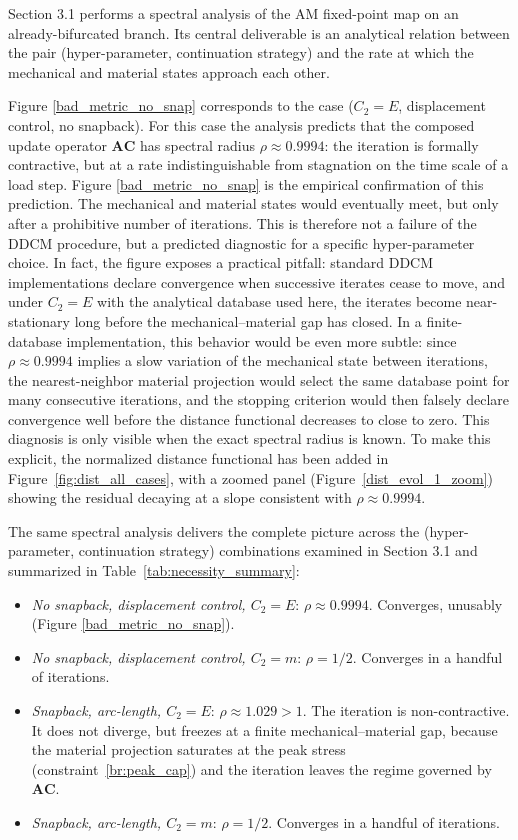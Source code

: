 \documentclass[10pt]{article}
\begin{document}
\begin{enumerate}
Section 3.1 performs a spectral analysis of the AM fixed-point map on an already-bifurcated branch. Its central deliverable is an analytical relation between the pair (hyper-parameter, continuation strategy) and the rate at which the mechanical and material states approach each other.

Figure \ref{bad_metric_no_snap} corresponds to the case ($C_2 = E$, displacement control, no snapback). For this case the analysis predicts that the composed update operator $\mathbf{A}\mathbf{C}$ has spectral radius $\rho \approx 0.9994$: the iteration is formally contractive, but at a rate indistinguishable from stagnation on the time scale of a load step. Figure \ref{bad_metric_no_snap} is the empirical confirmation of this prediction. The mechanical and material states would eventually meet, but only after a prohibitive number of iterations. This is therefore not a failure of the DDCM procedure, but a predicted diagnostic for a specific hyper-parameter choice. In fact, the figure exposes a practical pitfall: standard DDCM implementations declare convergence when successive iterates cease to move, and under $C_2 = E$ with the analytical database used here, the iterates become near-stationary long before the mechanical--material gap has closed. In a finite-database implementation, this behavior would be even more subtle: since $\rho \approx 0.9994$ implies a slow variation of the mechanical state between iterations, the nearest-neighbor material projection would select the same database point for many consecutive iterations, and the stopping criterion would then falsely declare convergence well before the distance functional decreases to close to zero. This diagnosis is only visible when the exact spectral radius is known. To make this explicit, the normalized distance functional has been added in Figure~\ref{fig:dist_all_cases}, with a zoomed panel (Figure~\ref{dist_evol_1_zoom}) showing the residual decaying at a slope consistent with $\rho \approx 0.9994$.


The same spectral analysis delivers the complete picture across the (hyper-parameter, continuation strategy) combinations examined in
Section 3.1 and summarized in Table~\ref{tab:necessity_summary}:
\begin{itemize}
	\item \emph{No snapback, displacement control, $C_2 = E$}: 	$\rho \approx 0.9994$. Converges, unusably (Figure \ref{bad_metric_no_snap}).
	\item \emph{No snapback, displacement control, $C_2 = m$}: $\rho = 1/2$. 	Converges in a handful of iterations.
	\item \emph{Snapback, arc-length, $C_2 = E$}: $\rho \approx 1.029 > 1$. The iteration is non-contractive. It does not diverge, but freezes at a finite mechanical--material gap, because the material projection saturates at the peak stress  (constraint~\ref{br:peak_cap}) and the iteration leaves the regime governed by $\mathbf{A}\mathbf{C}$.
	\item \emph{Snapback, arc-length, $C_2 = m$}: $\rho = 1/2$. Converges in a handful of iterations.
\end{itemize}


\end{enumerate}
\end{document}
